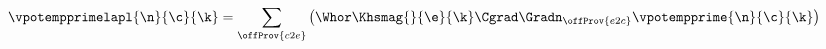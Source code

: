 $$\begin{aligned}
    & \vpotempprimelapl{\n}{\c}{\k} = \sum_{\offProv{c2e}} \left( \Whor \Khsmag{}{\e}{\k} \Cgrad \Gradn_{\offProv{e2c}} \vpotempprime{\n}{\c}{\k} \right)
\end{aligned}$$
